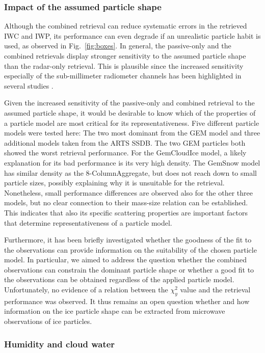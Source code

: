 \documentclass[journal abbreviation, manuscript]{copernicus}
\begin{document}
\subsubsection{Impact of the assumed particle shape}

Although the combined retrieval can reduce systematic errors in the retrieved
IWC and IWP, its performance can even degrade if an unrealistic particle habit
is used, as observed in Fig.~\ref{fig:boxes}. In general, the passive-only and
the combined retrievals display stronger sensitivity to the assumed particle shape
than the radar-only retrieval. This is plausible since the increased sensitivity
especially of the sub-millimeter radiometer channels has been highlighted
in several studies \citep{ekelund19a, fox19}.

Given the increased sensitivity of the passive-only and combined retrieval to
the assumed particle shape, it would be desirable to know which of the
properties of a particle model are most critical for its representativeness. Five
different particle models were tested here: The two most dominant from
the GEM model and three additional models taken from the ARTS SSDB. The two GEM
particles both showed the worst retrieval performance. For the GemCloudIce model, a
likely explanation for its bad performance is its very high density. The GemSnow model
has similar density as the 8-ColumnAggregate, but does not reach down to small
particle sizes, possibly explaining why it is unsuitable for the retrieval.
Nonetheless, small performance differences are observed also for the other three
models, but no clear connection to their mass-size relation can be established.
This indicates that also its specific scattering properties are important factors
that determine representativeness of a particle model.

Furthermore, it has been briefly investigated whether the goodness of the fit to
the observations can provide information on the suitability of the chosen
particle model. In particular, we aimed to address the question whether the
combined observations can constrain the dominant particle shape or whether a
good fit to the observations can be obtained regardless of the applied particle
model. Unfortunately, no evidence of a relation between the $\chi^2_y$ value and
the retrieval performance was observed. It thus remains an open question whether
and how information on the ice particle shape can be extracted from microwave
observations of ice particles.

\subsubsection{Humidity and cloud water}
\end{document}
